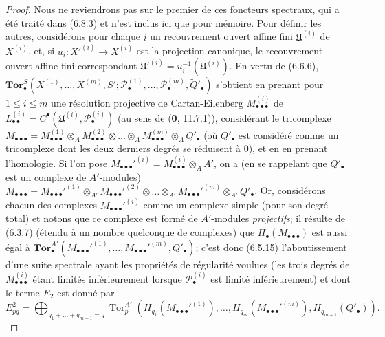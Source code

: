 \begin{proof}
Nous ne reviendrons pas sur le premier de ces foncteurs spectraux, qui a été
traité dans (6.8.3) et n'est inclus ici que pour mémoire. Pour définir les
autres, considérons pour chaque $i$ un recouvrement ouvert affine fini
$\mathfrak U^{(i)}$ de $X^{(i)}$, et, si
$u_i:X'^{(i)}\to X^{(i)}$ est la projection canonique, le recouvrement ouvert
affine fini correspondant
$\mathfrak U'^{(i)}=u_i^{-1}(\mathfrak U^{(i)})$.
En vertu de (6.6.6),
$\mathbf{Tor}_\bullet^S(X^{(1)},\ldots,X^{(m)},S';
\mathscr P_\bullet^{(1)},\ldots,\mathscr P_\bullet^{(m)},
\widetilde{Q}'_\bullet)$ s'obtient en prenant pour $1\leq i\leq m$ une
résolution projective de Cartan-Eilenberg
$M_{\bullet\bullet\bullet}^{(i)}$ de
$L_{\bullet\bullet}^{(i)}=C^\bullet(\mathfrak U^{(i)},
\mathscr P_\bullet^{(i)})$ (au sens de (\textbf{0}, 11.7.1)), considérant le
tricomplexe
$M_{\bullet\bullet\bullet}
=M_{\bullet\bullet\bullet}^{(1)}\otimes_A
M_{\bullet\bullet\bullet}^{(2)}\otimes\ldots\otimes_A
M_{\bullet\bullet\bullet}^{(m)}\otimes_A Q'_\bullet$
(où $Q'_\bullet$ est considéré comme un tricomplexe dont les deux derniers
degrés se réduisent à $0$), et en en prenant l'homologie. Si l'on pose
$M_{\bullet\bullet\bullet}'^{(i)}=
M_{\bullet\bullet\bullet}^{(i)}\otimes_A A'$, on a (en se rappelant que
$Q'_\bullet$ est un complexe de $A'$-modules)
$M_{\bullet\bullet\bullet}
=M_{\bullet\bullet\bullet}'^{(1)}\otimes_{A'}
M_{\bullet\bullet\bullet}'^{(2)}\otimes\ldots\otimes_{A'}
M_{\bullet\bullet\bullet}'^{(m)}\otimes_{A'} Q'_\bullet$.
Or, considérons chacun des complexes
$M_{\bullet\bullet\bullet}'^{(i)}$ comme un complexe simple (pour son degré
total) et notons que ce complexe est formé de $A'$-modules \emph{projectifs}; il
résulte de (6.3.7) (étendu à un nombre quelconque de complexes) que
$H_\bullet(M_{\bullet\bullet\bullet})$ est aussi égal à
$\mathbf{Tor}_\bullet^{A'}
(M_{\bullet\bullet\bullet}'^{(1)},\ldots,
M_{\bullet\bullet\bullet}'^{(m)},Q'_\bullet)$;
c'est donc (6.5.15) l'aboutissement d'une suite spectrale ayant les propriétés
de régularité voulues (les trois degrés de
$M_{\bullet\bullet\bullet}^{(i)}$ étant limités inférieurement lorsque
$\mathscr P_\bullet^{(i)}$ est limité inférieurement) et dont le terme $E_2$
est donné par
\[
  E_{pq}^2
  =\bigoplus_{q_1+\ldots+q_{m+1}=q}
  \operatorname{Tor}_p^{A'}
  (H_{q_1}(M_{\bullet\bullet\bullet}'^{(1)}),\ldots,
   H_{q_m}(M_{\bullet\bullet\bullet}'^{(m)}),H_{q_{m+1}}(Q'_\bullet)).
\]


\end{proof}
